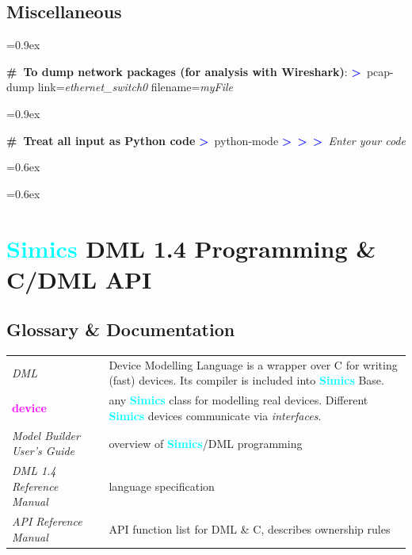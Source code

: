\documentclass[8pt]{extarticle}
\newenvironment{code}[1][]{%
\begin{prebox}[#1]\obeylines%
\fontdimen2\font=0.9ex%
}{%
\end{prebox}%
\fontdimen2\font=0.6ex%
}
\newcommand{\sprompt}{\textcolor{blue}{\textbf{>}\ }}
\newcommand{\kw}[1]{\textcolor{magenta}{\textbf{#1}}}
\newcommand{\cmtcommon}[1]{\textcolor{Sepia}{\textbf{#1}}}
\newcommand{\cmt}[1]{\cmtcommon{\#\ #1}}
\newcommand{\p}[1]{\textit{\large#1}}
\newcommand{\Simics}{\textcolor{cyan}{\textbf{Simics}}}
\newlength{\MyLen}
\begin{document}
\begin{multicols*}{3}

\subsection{Miscellaneous}
\begin{code}
    \cmt{To dump network packages (for analysis with Wireshark)}:
    \sprompt pcap-dump link=\p{ethernet_switch0} filename=\p{myFile}
    \begin{code}
    \cmt{Treat all input as Python code}
    \sprompt python-mode
        \sprompt \sprompt \sprompt \p{Enter your code}
    \end{code}
    
\end{code}

\ifdefined\cheatsheetCompact
\vspace{0.4cm}
\fi

\section{\Simics{} DML 1.4 Programming \& C/DML API}

\subsection{Glossary \& Documentation}
    \noindent\begin{tabular}{p{\the\MyLen}p{\linewidth-\the\MyLen-0.8cm}}
        \textit{DML}         & Device Modelling Language is a
        wrapper over C for writing (fast) devices.
        Its compiler is included into \Simics{} Base.
        \\
        \kw{device}          & any \Simics{} class for modelling real
        devices. Different \Simics{} devices communicate via \textit{interfaces}.
        \\
        \textit{Model Builder User’s Guide} & overview of \Simics{}/DML
        programming \\
        \textit{DML 1.4 Reference Manual} & language specification \\
        \textit{API Reference Manual} & API function list for DML \& C,
        describes ownership rules
    \end{tabular}


\end{multicols*}
\end{document}

